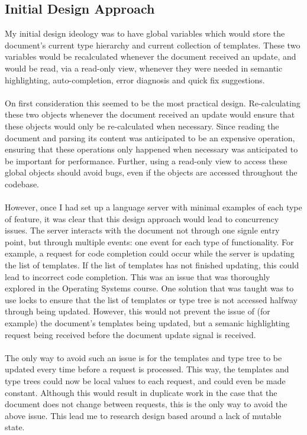 \documentclass[../main.tex]{subfiles}
\begin{document}
\subsection{Initial Design Approach}
My initial design ideology was to have global variables which would store the document's current type hierarchy and current collection of templates. These two variables would be recalculated whenever the document received an update, and would be read, via a read-only view, whenever they were needed in semantic highlighting, auto-completion, error diagnosis and quick fix suggestions. 
\\
\\
On first consideration this seemed to be the most practical design. Re-calculating these two objects whenever the document received an update would ensure that these objects would only be re-calculated when necessary. Since reading the document and parsing its content was anticipated to be an expensive operation, ensuring that these operations only happened when necessary was anticipated to be important for performance. Further, using a read-only view to access these global objects should avoid bugs, even if the objects are accessed throughout the codebase.
\\
\\
However, once I had set up a language server with minimal examples of each type of feature, it was clear that this design approach would lead to concurrency issues. The server interacts with the document not through one signle entry point, but through multiple events: one event for each type of functionality. For example, a request for code completion could occur while the server is updating the list of templates. If the list of templates has not finished updating, this could lead to incorrect code completion.
This was an issue that was thoroughly explored in the Operating Systems course. One solution that was taught was to use locks to ensure that the list of templates or type tree is not accessed halfway through being updated. However, this would not prevent the issue of (for example) the document's templates being updated, but a semanic highlighting request being received before the document update signal is received. 
\\
\\
The only way to avoid such an issue is for the templates and type tree to be updated every time before a request is processed. This way, the templates and type trees could now be local values to each request, and could even be made constant. Although this would result in duplicate work in the case that the document does not change between requests, this is the only way to avoid the above issue. This lead me to research design based around a lack of mutable state.
\end{document}
